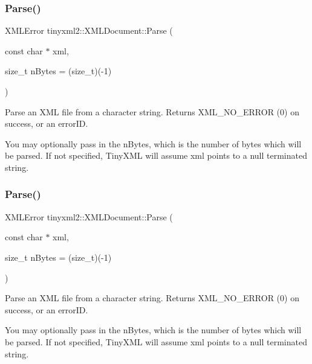 \subsubsection{\texorpdfstring{Parse()}{Parse()}\hspace{0.1cm}{\footnotesize\ttfamily [1/2]}}
{\footnotesize\ttfamily X\+M\+L\+Error tinyxml2\+::\+X\+M\+L\+Document\+::\+Parse (\begin{DoxyParamCaption}\item[{const char $\ast$}]{xml,  }\item[{size\+\_\+t}]{n\+Bytes = {\ttfamily (size\+\_\+t)(-\/1)} }\end{DoxyParamCaption})}

Parse an X\+ML file from a character string. Returns X\+M\+L\+\_\+\+N\+O\+\_\+\+E\+R\+R\+OR (0) on success, or an error\+ID.

You may optionally pass in the \textquotesingle{}n\+Bytes\textquotesingle{}, which is the number of bytes which will be parsed. If not specified, Tiny\+X\+ML will assume \textquotesingle{}xml\textquotesingle{} points to a null terminated string. \mbox{\label{classtinyxml2_1_1XMLDocument_a1819bd34f540a7304c105a6232d25a1f}} 
\subsubsection{\texorpdfstring{Parse()}{Parse()}\hspace{0.1cm}{\footnotesize\ttfamily [2/2]}}
{\footnotesize\ttfamily X\+M\+L\+Error tinyxml2\+::\+X\+M\+L\+Document\+::\+Parse (\begin{DoxyParamCaption}\item[{const char $\ast$}]{xml,  }\item[{size\+\_\+t}]{n\+Bytes = {\ttfamily (size\+\_\+t)(-\/1)} }\end{DoxyParamCaption})}

Parse an X\+ML file from a character string. Returns X\+M\+L\+\_\+\+N\+O\+\_\+\+E\+R\+R\+OR (0) on success, or an error\+ID.

You may optionally pass in the \textquotesingle{}n\+Bytes\textquotesingle{}, which is the number of bytes which will be parsed. If not specified, Tiny\+X\+ML will assume \textquotesingle{}xml\textquotesingle{} points to a null terminated string. \mbox{\label{classtinyxml2_1_1XMLDocument_a2e57602756e197341711a4a0b84c52c5}} 
